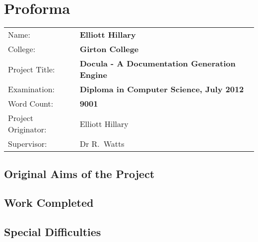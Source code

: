 \chapter*{Proforma}

{\large
\begin{tabular}{ll}
Name:               & \bf Elliott Hillary                       \\
College:            & \bf Girton College                     \\
Project Title:      & \bf Docula - A Documentation Generation Engine \\
Examination:        & \bf Diploma in Computer Science, July 2012        \\
Word Count:         & \bf 9001                             \\
Project Originator: & Elliott Hillary                    \\
Supervisor:         & Dr R.~Watts                   \\ 
\end{tabular}
}

\section*{Original Aims of the Project}



\section*{Work Completed}



\section*{Special Difficulties}

